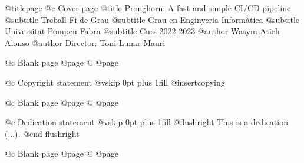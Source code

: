 @titlepage
@c Cover page
@title Pronghorn: A fast and simple CI/CD pipeline
@subtitle Treball Fi de Grau
@subtitle Grau en Enginyeria Informàtica
@subtitle Universitat Pompeu Fabra
@subtitle Curs 2022-2023
@author Wasym Atieh Alonso
@author Director: Toni Lunar Mauri

@c Blank page
@page
@
@page

@c Copyright statement
@vskip 0pt plus 1fill
@insertcopying

@c Blank page
@page
@
@page

@c Dedication statement
@vskip 0pt plus 1fill
@flushright
This is a dedication (...).
@end flushright

@c Blank page
@page
@
@page
